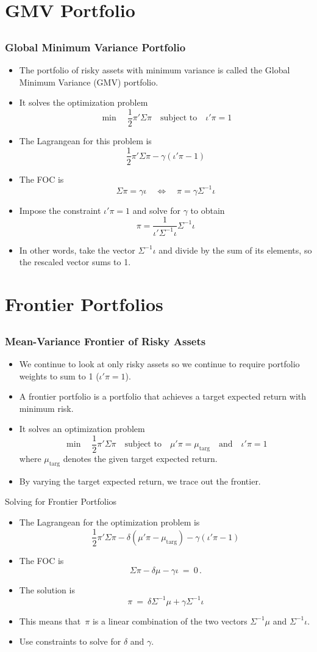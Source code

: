\documentclass[10pt]{beamer}
\newcommand{\bi}{\begin{itemize}}
\newcommand{\ei}{\end{itemize}}
\newcommand{\im}{\item}
\newcommand{\bfr}{\begin{frame}}
\begin{document}
  \section{GMV Portfolio}\subsection{}
  
  \bfr\frametitle{Global Minimum Variance Portfolio}
  \bi 
  \im The portfolio of risky assets with minimum variance is called the Global Minimum Variance (GMV) portfolio.
  
  \im It solves the optimization problem
  $$\min \quad\frac{1}{2}\pi'\Sigma\pi \quad\text{subject to}\quad \iota '\pi = 1$$
  \im The Lagrangean for this problem is
  $$\frac{1}{2}\pi'\Sigma\pi - \gamma (\iota '\pi - 1)$$
  \im The FOC is
  $$\Sigma\pi =  \gamma \iota \quad \Leftrightarrow \quad \pi = \gamma\Sigma^{-1}\iota$$
  \im Impose the constraint $\iota '\pi = 1$ and solve for $\gamma$ to obtain
  $$\pi = \frac{1}{\iota ' \Sigma^{-1}\iota} \Sigma^{-1}\iota$$
  \im In other words, take the vector $\Sigma^{-1}\iota$ and divide by the sum of its elements, so the rescaled vector sums to 1.
  \ei 
\end{frame}
  
  \section{Frontier Portfolios}\subsection{}
  
  
  \bfr\frametitle{Mean-Variance Frontier of Risky Assets}
  \bi 
  \im We continue to look at only risky assets so we continue to require portfolio weights to sum to 1 ($\iota'\pi=1$).
  
  \im A \alert{frontier portfolio} is a portfolio that achieves a target expected return with minimum risk.  
  \im It solves an optimization problem
  $$\min \quad\frac{1}{2}\pi'\Sigma\pi \quad\text{subject to}\quad \mu'\pi=\mu_{\text{targ}}\quad\text{and}\quad \iota '\pi = 1$$
  where $\mu_{\text{targ}}$ denotes the given target expected return.
  
  \im By varying the target expected return, we trace out the frontier.
  \ei 
  \end{frame}
  
  \begin{frame}{Solving for Frontier Portfolios}
    \bi 
  \im The Lagrangean for the optimization problem is 
  $$\frac{1}{2}\pi'\Sigma\pi - \delta(\mu'\pi-\mu_{\text{targ}}) - \gamma (\iota '\pi - 1)$$
  \im The FOC is
  $$\Sigma \pi - \delta \mu - \gamma \iota \ = \ 0\,.$$
  \im The solution is
  $$\pi \ = \ \delta \Sigma^{-1}\mu + \gamma\Sigma^{-1}\iota$$
  \im This means that~$\pi$ is a linear combination of the two vectors $\Sigma^{-1}\mu$ and $\Sigma^{-1}\iota$.  
  \im Use constraints to solve for $\delta$ and $\gamma$. 
  \ei
  \end{frame}
  
\end{document}
